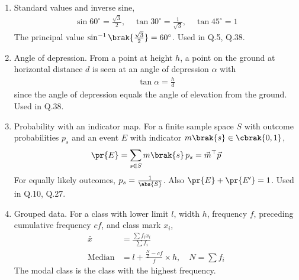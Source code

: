 \begin{enumerate}[label=\thesubsection.\arabic*, ref=\thesubsection.\theenumi]
\begin{align}
	I = \frac{Prt}{100} \label{eq:CBSE25S2-interest}
\end{align}
Used in Q.34.
\item Standard values and inverse sine,
\begin{align}
	\sin 60^\circ = \frac{\sqrt{3}}{2}, \quad \tan 30^\circ = \frac{1}{\sqrt{3}}, \quad \tan 45^\circ = 1 \label{eq:CBSE25S2-trig}
\end{align}
The principal value $\sin^{-1}\brak{\frac{\sqrt{3}}{2}} = 60^\circ$. Used in Q.5, Q.38.
\item Angle of depression. From a point at height $h$, a point on the ground at horizontal distance $d$ is seen at an angle of depression $\alpha$ with
\begin{align}
	\tan\alpha = \frac{h}{d} \label{eq:CBSE25S2-depression}
\end{align}
since the angle of depression equals the angle of elevation from the ground. Used in Q.38.
\item Probability with an indicator map. For a finite sample space $S$ with outcome probabilities $p_s$ and an event $E$ with indicator $m\brak{s} \in \cbrak{0,1}$,
\begin{align}
	\pr{E} = \sum_{s \in S} m\brak{s}\,p_s = \vec{m}^{\top}\vec{p} \label{eq:CBSE25S2-prob}
\end{align}
For equally likely outcomes, $p_s = \frac{1}{\abs{S}}$. Also $\pr{E} + \pr{E^{\prime}} = 1$. Used in Q.10, Q.27.
\item Grouped data. For a class with lower limit $l$, width $h$, frequency $f$, preceding cumulative frequency $cf$, and class mark $x_i$,
\begin{align}
	\bar{x} &= \frac{\sum f_i x_i}{\sum f_i} \label{eq:CBSE25S2-mean}
	\\
	\text{Median} &= l + \frac{\frac{N}{2} - cf}{f}\times h, \quad N = \sum f_i \label{eq:CBSE25S2-median}
\end{align}
The modal class is the class with the highest frequency. 
\end{enumerate}
